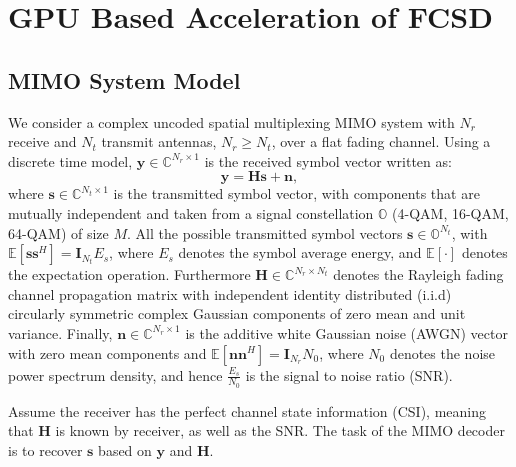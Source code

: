 \documentclass[letterpaper, 10pt, conference]{ieeeconf}
\begin{document}
\section{GPU Based Acceleration of FCSD}\label{GPUFCSD}
\subsection{MIMO System Model}\label{system}

We consider a complex uncoded spatial multiplexing MIMO system with $N_r$ receive and $N_t$ transmit antennas, $N_{r}\geq N_{t}$, over a flat fading channel. Using a discrete time model, $\mathbf{y}\in\mathbb{C}^{N_{r}\times 1}$ is the received symbol vector written as:
\begin{equation}
\mathbf{y}=\mathbf{H}\mathbf{s}+\mathbf{n},   \label{formula 1}
\end{equation}
where $\mathbf{s}\in \mathbb{C}^{N_{t}\times 1}$ is the transmitted symbol vector, with components that are mutually independent and taken from a signal constellation $\mathbb{O}$ (4-QAM, 16-QAM, 64-QAM) of size $M$. All the possible transmitted symbol vectors $\mathbf{s}\in \mathbb{O}^{N_{t}}$, with $\mathbb{E}[\mathbf{s}\mathbf{s}^{H}]=\mathbf{I}_{N_t}E_{s}$, where $E_{s}$ denotes the symbol average energy, and $\mathbb{E}[\cdot]$ denotes the expectation operation. Furthermore $\mathbf{H}\in \mathbb{C}^{N_{r}\times N_{t}}$ denotes the Rayleigh fading channel propagation matrix with independent identity distributed (i.i.d) circularly symmetric complex Gaussian components of zero mean and unit variance. Finally, $\mathbf{n}\in \mathbb{C}^{N_{r}\times 1}$ is the additive white Gaussian noise (AWGN) vector with zero mean components and $\mathbb{E}[\mathbf{n}\mathbf{n}^{H}]=\mathbf{I}_{N_{r}}N_{0}$, where $N_{0}$ denotes the noise power spectrum density, and hence $\frac{E_{s}}{N_{0}}$ is the signal to noise ratio (SNR). 

Assume the receiver has the perfect channel state information (CSI), meaning that $ \mathbf{H}$ is known by receiver, as well as the SNR. The task of the MIMO decoder is to recover $\mathbf{s}$ based on $\mathbf{y}$ and $\mathbf{H}$.
\end{document}
